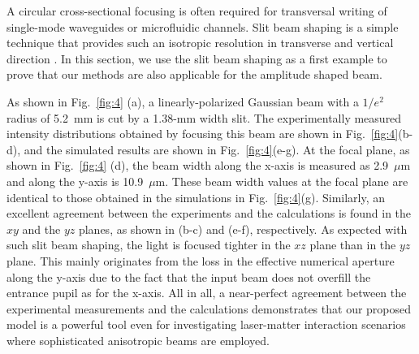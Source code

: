 \documentclass[9pt,twocolumn,twoside]{osajnl}
\begin{document}
A circular cross-sectional focusing is often required for transversal writing of single-mode waveguides or microfluidic channels. Slit beam shaping is a simple technique that provides such an isotropic resolution in transverse and vertical direction \cite{cheng2003control, ams2005slit}. In this section, we use the slit beam shaping as a first example to prove that our methods are also applicable for the amplitude shaped beam. 

As shown in Fig.~\ref{fig:4} (a), a linearly-polarized Gaussian beam with a $1/e^2$ radius of 5.2~mm is cut by a 1.38-mm width slit. The experimentally measured intensity distributions obtained by focusing this beam are shown in Fig.~\ref{fig:4}(b-d), and the simulated results are shown in Fig.~\ref{fig:4}(e-g). At the focal plane, as shown in Fig.~\ref{fig:4} (d), the beam width along the x-axis is measured as 2.9~$\mu$m and along the y-axis is 10.9~$\mu$m. These beam width values at the focal plane are identical to those obtained in the simulations in Fig.~\ref{fig:4}(g). Similarly, an excellent agreement between the experiments and the calculations is found in the $xy$ and the $yz$ planes, as shown in (b-c) and (e-f), respectively. As expected with such slit beam shaping, the light is focused tighter in the $xz$ plane than in the $yz$ plane. This mainly originates from the loss in the effective numerical aperture along the y-axis due to the fact that the input beam does not overfill the entrance pupil as for the x-axis.
All in all, a near-perfect agreement between the experimental measurements and the calculations demonstrates that our proposed model is a powerful tool even for investigating laser-matter interaction scenarios where sophisticated anisotropic beams are employed. 
\end{document}
